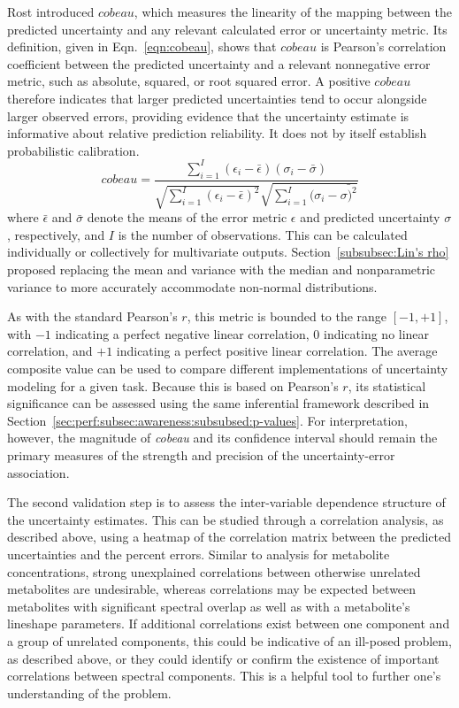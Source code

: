 Rost \cite{Rost2019} introduced $cobeau$, which measures the linearity of the mapping between the predicted uncertainty and any relevant calculated error or uncertainty metric. Its definition, given in Eqn.~\ref{eqn:cobeau}, shows that $cobeau$ is Pearson’s correlation coefficient between the predicted uncertainty and a relevant nonnegative error metric, such as absolute, squared, or root squared error. A positive $cobeau$ therefore indicates that larger predicted uncertainties tend to occur alongside larger observed errors, providing evidence that the uncertainty estimate is informative about relative prediction reliability. It does not by itself establish probabilistic calibration. 
\begin{equation}\label{eqn:cobeau}
    cobeau = \frac{\sum_{i=1}^I(\epsilon_i - \bar{\epsilon})(\sigma_i-\bar{\sigma})}{\sqrt{\sum_{i=1}^I(\epsilon_i - \bar{\epsilon})^2}\sqrt{\sum_{i=1}^I(\sigma_i - \bar{\sigma)^2}}}
\end{equation}
\noindent where $\bar{\epsilon}$ and $\bar{\sigma}$ denote the means of the error metric $\epsilon$ and predicted uncertainty $\sigma$, respectively, and $I$ is the number of observations. This can be calculated individually or collectively for multivariate outputs. Section~\ref{subsubsec:Lin's rho} proposed replacing the mean and variance with the median and nonparametric variance to more accurately accommodate non-normal distributions.

As with the standard Pearson’s $r$, this metric is bounded to the range $[-1,+1]$, with $-1$ indicating a perfect negative linear correlation, $0$ indicating no linear correlation, and $+1$ indicating a perfect positive linear correlation. The average composite value can be used to compare different implementations of uncertainty modeling for a given task. Because this is based on Pearson’s $r$, its statistical significance can be assessed using the same inferential framework described in Section~\ref{sec:perf:subsec:awareness:subsubsed:p-values}. For interpretation, however, the magnitude of \textit{cobeau} and its confidence interval should remain the primary measures of the strength and precision of the uncertainty-error association.

The second validation step is to assess the inter-variable dependence structure of the uncertainty estimates. This can be studied through a correlation analysis, as described above, using a heatmap of the correlation matrix between the predicted uncertainties and the percent errors. Similar to analysis for metabolite concentrations, strong unexplained correlations between otherwise unrelated metabolites are undesirable, whereas correlations may be expected between metabolites with significant spectral overlap as well as with a metabolite's lineshape parameters. If additional correlations exist between one component and a group of unrelated components, this could be indicative of an ill-posed problem, as described above, or they could identify or confirm the existence of important correlations between spectral components. This is a helpful tool to further one’s understanding of the problem.

